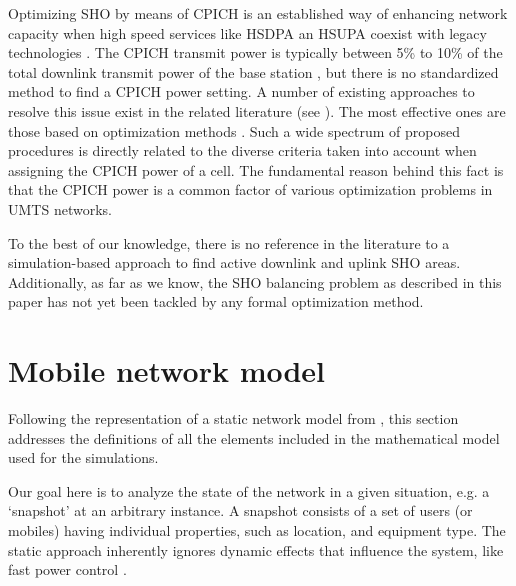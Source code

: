 Optimizing SHO by means of CPICH is an established way of enhancing
network capacity when high speed services like HSDPA an HSUPA coexist
with legacy technologies \cite{chen2008cpich}. The CPICH transmit
power is typically between 5\% to 10\% of the total downlink transmit
power of the base station \cite{RadioNetworkPlanningAndOptimisationForUMTS},
but there is no standardized method to fi{}nd a CPICH power setting.
A number of existing approaches to resolve this issue exist in the
related literature (see \cite{WCDMAforUMTS_RadioAccessForThirdGenerationMobileCommunications,Siomina_PilotPowerManagementInWCDMANetworksCoverageControlWithRespectToTrafficDistribution,Ying_CPICHPowerSettingsInIrregularWCDMAMacroCellularNetworks}).
The most eff{}ective ones are those based on optimization methods
\cite{Eisenblatter_OptimizationMethodsForUMTSRadioNetworkPlanning,GarciaLozano_CPICHPowerOptimisationByMeansOfSimulatedAnnealingInAnUTRAFDDEnvironment,RadioNetworkPlanningAndOptimisationForUMTS,UMTSRadioNetworkPlanning_OptimizationAndQoSManagementForPracticalEngineeringTasks,siomina2008minimum}.
Such a wide spectrum of proposed procedures is directly related to
the diverse criteria taken into account when assigning the CPICH power
of a cell. The fundamental reason behind this fact is that the CPICH
power is a common factor of various optimization problems in UMTS
networks.

To the best of our knowledge, there is no reference in the literature
to a simulation-based approach to find active downlink and uplink
SHO areas. Additionally, as far as we know, the SHO balancing problem
as described in this paper has not yet been tackled by any formal
optimization method.


\section{Mobile network model \label{sec:Static_network_model}}

Following the representation of a static network model from \cite{nawrocki2006understanding},
this section addresses the definitions of all the elements included
in the mathematical model used for the simulations.

Our goal here is to analyze the state of the network in a given situation,
e.g. a \textquoteleft{}snapshot\textquoteright{} at an arbitrary instance.
A snapshot consists of a set of users (or mobiles) having individual
properties, such as location, and equipment type. The static approach
inherently ignores dynamic effects that influence the system, like
fast power control \cite{nawrocki2006understanding}.

